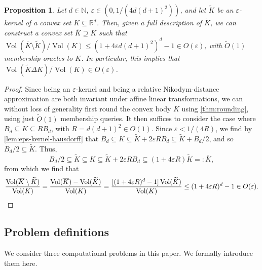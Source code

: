 \documentclass[11pt]{article}
\newtheorem{proposition}[theorem]{Proposition}
\newcommand{\N}{\ensuremath{\mathbb{N}}}
\newcommand{\R}{\ensuremath{\mathbb{R}}}
\DeclareMathOperator{\Vol}{Vol}
\begin{document}
    \begin{proposition}
        \label{prop:eps-kernel-volumetric-approximation}
        Let $d \in \N$, $\varepsilon \in (0,1/(4d(d+1)^2))$, and let $\widetilde{K}$ be an $\varepsilon$-kernel of a convex set $K \subseteq \R^d$. Then, given a full description of $\widetilde{K}$, we can construct a convex set $\overline{K} \supseteq K$ such that $\Vol(\overline{K} \setminus \widetilde{K})/\Vol(K) \leq (1+4\varepsilon d(d+1)^2)^d - 1 \in O(\varepsilon)$, with $\widetilde{O}(1)$ membership oracles to $K$. In particular, this implies that $\Vol(\widetilde{K} \Delta K)/\Vol(K) \in O(\varepsilon)$.
    \end{proposition}

    \begin{proof}
        Since being an $\varepsilon$-kernel and being a relative Nikodym-distance approximation are both invariant under affine linear transformations, we can without loss of generality first round the convex body $K$ using \cref{thm:rounding}, using just $\widetilde{O}(1)$ membership queries. It then suffices to consider the case where $B_d \subseteq K \subseteq RB_d$, with $R = d(d+1)^2 \in O(1)$. Since $\varepsilon < 1/(4R)$, we find by \cref{lem:eps-kernel-hausdorff} that $B_d \subseteq K \subseteq \widetilde{K} + 2\varepsilon RB_d \subseteq \widetilde{K} + B_d/2$, and so $B_d/2 \subseteq \widetilde{K}$. Thus,
        \[B_d/2 \subseteq \widetilde{K} \subseteq K \subseteq \widetilde{K} + 2\varepsilon RB_d \subseteq (1+4\varepsilon R)\widetilde{K} =: \overline{K},\]
        from which we find that
        \[\frac{\Vol(\overline{K} \setminus \widetilde{K})}{\Vol(K)} = \frac{\Vol(\overline{K}) - \Vol(\widetilde{K})}{\Vol(K)} = \frac{[(1+4\varepsilon R)^d - 1]\Vol(\widetilde{K})}{\Vol(K)} \leq (1+4\varepsilon R)^d - 1 \in O(\varepsilon).\qedhere\]
    \end{proof}

    \subsection{Problem definitions}

    We consider three computational problems in this paper. We formally introduce them here.
\end{document}
